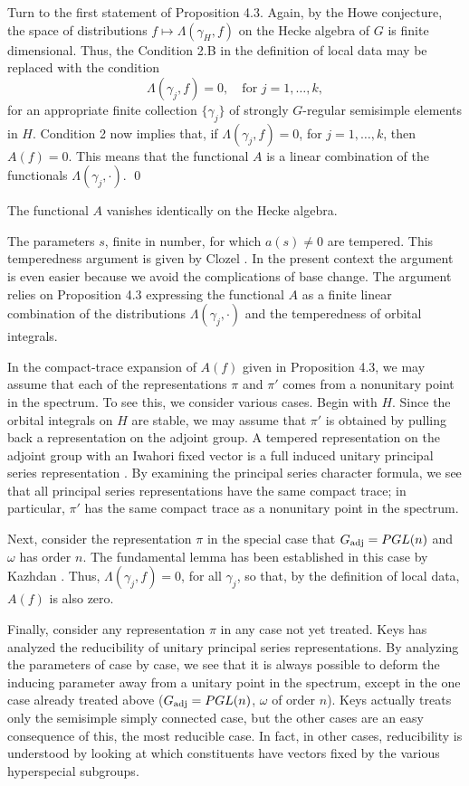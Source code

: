 Turn to the first statement of Proposition 4.3.  Again, 
by the Howe conjecture, the space
of distributions $f\mapsto \Lambda(\gamma_H,f)$ on the Hecke
algebra of $G$ is finite dimensional.  Thus, the Condition 2.B
in the definition of local data may be replaced with the
condition
$$\Lambda(\gamma_j,f) = 0,\quad \text{for } j=1,\dots,k,\tag{$B'$}$$
for an appropriate finite collection $\{\gamma_j\}$ of strongly $G$-regular
semisimple elements in $H$.  Condition 2 now implies that, if $\Lambda(\gamma_j,f)=0$,
for $j=1,\ldots,k$, then $A(f)=0$.  This means that the functional
$A$ is a linear combination of the functionals $\Lambda(\gamma_j,\cdot)$.
\qed
\enddemo

  The functional $A$ vanishes identically
on the Hecke algebra.
\endproclaim

 The parameters $s$,
finite in number, for which $a(s)\ne 0$
are tempered.  This temperedness argument is given by Clozel \cite{Cl2,5.5}.  In the
present context the argument is even easier because we avoid the complications
of base change.  The argument relies on Proposition 4.3 expressing the functional
$A$ as a finite linear combination of the distributions $\Lambda(\gamma_j,\cdot)$ and the temperedness of orbital integrals.

In the compact-trace expansion of $A(f)$ given in Proposition 4.3,
we may assume that each of the representations $\pi$ and
$\pi'$ comes from a nonunitary point in the spectrum.  To see this,
we consider various cases.
Begin with $H$. Since the orbital integrals on $H$ are stable,
we may assume that $\pi'$ 
is obtained by pulling back a representation on the adjoint group.
A tempered representation on the adjoint group with an Iwahori fixed
vector is a full induced unitary principal series representation \cite{Ke}.
By examining the principal series character formula, we see that all 
principal series representations have the same compact trace; in
particular, $\pi'$ has the same compact trace as a nonunitary point in the
spectrum.

Next, consider the representation $\pi$ in the special case that $G_{\text{adj}}=PGL(n)$
and $\omega$ has order $n$.  
The fundamental lemma has been established in this
case by Kazhdan \cite{Ka}. Thus, $\Lambda(\gamma_j,f)=0$, for all $\gamma_j$,
so that, by the definition of local data, $A(f)$ is also zero.

Finally,  consider any representation $\pi$ 
in any case not yet treated.
Keys has analyzed the reducibility of unitary principal series representations.
By analyzing the parameters of \cite{Ke} case by case, we see that it
is always possible to deform the inducing parameter away from a unitary point
in the spectrum, except in the one case already treated above ($G_{\text{adj}}=PGL(n)$, $\omega$
of order $n$).  Keys actually treats only the semisimple simply connected case,
but the other cases are an easy consequence of this, the most reducible case.
In fact, in other cases, reducibility is understood by looking at which
constituents have vectors fixed by the various hyperspecial subgroups.

